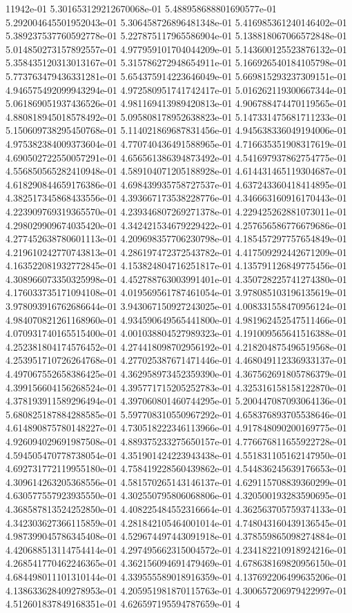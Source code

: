 11942e-01	5.301653129212670068e-01	5.488958688801690577e-01	5.292004645501952043e-01	5.306458726896481348e-01	5.416985361240146402e-01	5.389237537760592778e-01	5.227875117965586904e-01	5.138818067066572848e-01	5.014850273157892557e-01	4.977959101704044209e-01	5.143600125523876132e-01	5.358435120313013167e-01	5.315786272948654911e-01	5.166926540184105798e-01	5.773763479436331281e-01	5.654375914223646049e-01	5.669815293237309151e-01	4.946575492099943294e-01	4.972580951741742417e-01	5.016262119300667344e-01	5.061869051937436526e-01	4.981169413989420813e-01	4.906788474470119565e-01	4.880818945018578492e-01	5.095808178952638823e-01	5.147331475681711233e-01	5.150609738295450768e-01	5.114021869687831456e-01	4.945638336049194006e-01	4.975382384009373604e-01	4.770740436491588965e-01	4.716635351908317619e-01	4.690502722550057291e-01	4.656561386394873492e-01	4.541697937862754775e-01	4.556850565282410948e-01	4.589104071205188928e-01	4.614431465119304687e-01	4.618290844659176386e-01	4.698439935758727537e-01	4.637243360418414895e-01	4.382517345868433556e-01	4.393667173538228776e-01	4.346663160916170443e-01	4.223909769319365570e-01	4.239346807269271378e-01	4.229425262881073011e-01	4.298029909674035420e-01	4.342421534679229422e-01	4.257656586776679686e-01	4.277452638780601113e-01	4.209698357706230798e-01	4.185457297757654849e-01	4.219610242770743813e-01	4.286197472372543782e-01	4.417509292442671209e-01	4.163522081932772845e-01	4.153824804716251817e-01	4.135791126849775456e-01	4.308966073350325998e-01	4.452788763003991401e-01	4.350728225741274380e-01	4.176033735171094108e-01	4.019569561787461054e-01	3.978085103196135619e-01	3.978093916762686644e-01	3.943067150927243025e-01	4.008331558470956124e-01	4.984070821261168960e-01	4.934590649565441800e-01	4.981962452547511466e-01	4.070931740165515400e-01	4.001038804527989323e-01	4.191009565641516388e-01	4.252381804174576452e-01	4.274418098702956192e-01	4.218204875496519568e-01	4.253951710726264768e-01	4.277025387671471446e-01	4.468049112336933137e-01	4.497067552658386425e-01	4.362958973452359390e-01	4.367562691805786379e-01	4.399156604156268524e-01	4.395771715205252783e-01	4.325316158158122870e-01	4.378193911589296494e-01	4.397060801460744295e-01	5.200447087093064136e-01	5.680825187884288585e-01	5.597708310550967292e-01	4.658376893705538646e-01	4.614890875780148227e-01	4.730518222346113966e-01	4.917848090200169775e-01	4.926094029691987508e-01	4.889375233275650157e-01	4.776676811655922728e-01	4.594505470778738054e-01	4.351901424223943438e-01	4.551831105162147950e-01	4.692731772119955180e-01	4.758419228560439862e-01	4.544836245639176653e-01	4.309614263205368556e-01	4.581570265143146137e-01	4.629115708839360299e-01	4.630577557923935550e-01	4.302550795806068806e-01	4.320500193283590695e-01	4.368587813524252850e-01	4.408225484552316664e-01	4.362563705759374133e-01	4.342303627366115859e-01	4.281842105464001014e-01	4.748043160439136545e-01	4.987399045786345408e-01	4.529674497443091918e-01	4.378559865098274884e-01	4.420688513114754414e-01	4.297495662315004572e-01	4.234182210918924216e-01	4.268541770462246365e-01	4.362156094691479469e-01	4.678638169820956150e-01	4.684498011101310144e-01	4.339555589018916359e-01	4.137692206499635206e-01	4.138633628409278953e-01	4.205951981870115763e-01	4.300657206979422997e-01	4.512601837849168351e-01	4.626597195594787659e-01	4